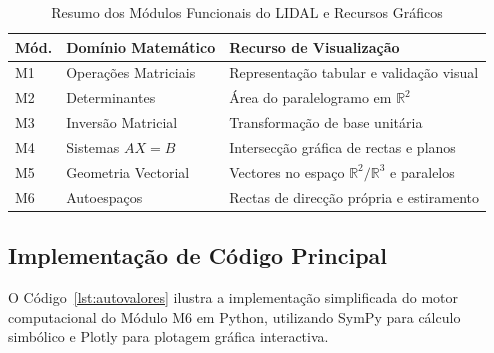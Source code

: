 \documentclass[conference]{IEEEtran}
\begin{document}
\begin{table}[htbp]
\caption{Resumo dos Módulos Funcionais do LIDAL e Recursos Gráficos}
\label{tab:modulos}
\centering
\footnotesize
\begin{tabular}{|p{0.5cm}|p{1.9cm}|p{3.6cm}|}
\hline
\textbf{Mód.} & \textbf{Domínio Matemático} & \textbf{Recurso de Visualização} \\
\hline
M1 & Operações Matriciais & Representação tabular e validação visual \\
\hline
M2 & Determinantes & Área do paralelogramo em $\mathbb{R}^2$ \\
\hline
M3 & Inversão Matricial & Transformação de base unitária \\
\hline
M4 & Sistemas $AX=B$ & Intersecção gráfica de rectas e planos \\
\hline
M5 & Geometria Vectorial & Vectores no espaço $\mathbb{R}^2/\mathbb{R}^3$ e paralelos \\
\hline
M6 & Autoespaços & Rectas de direcção própria e estiramento \\
\hline
\end{tabular}
\end{table}

\subsection{Implementação de Código Principal}

O Código~\ref{lst:autovalores} ilustra a implementação simplificada do motor computacional do Módulo M6 em Python, utilizando SymPy para cálculo simbólico e Plotly para plotagem gráfica interactiva.
\end{document}
